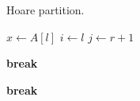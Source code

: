 
\begin{algorithm}[H]
  \caption{Hoare partition.}
  \begin{algorithmic}[]
      \State $x \gets A[l]$
      \State $i \gets l$
      \State $j \gets r + 1$

      \Statex
	    \State \textbf{break}
	  \EndIf
	\EndWhile

	    \State \textbf{break}
	  \EndIf
	\EndWhile

	\Statex
	  \State {}
	\EndIf
      \EndWhile

      \Statex
      \State {}
    \EndProcedure
  \end{algorithmic}
\end{algorithm}
